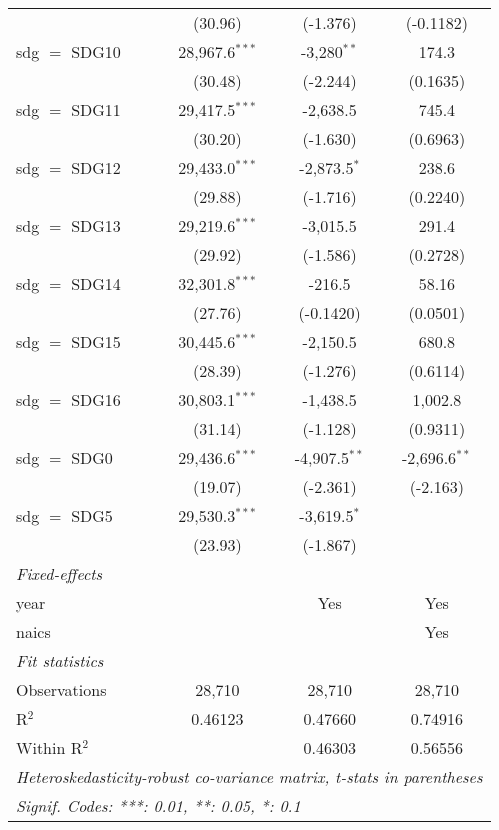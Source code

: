 \begin{tabular}{lccc}
                 & (30.96)          & (-1.376)        & (-0.1182)\\   
   sdg $=$ SDG10 & 28,967.6$^{***}$ & -3,280$^{**}$   & 174.3\\   
                 & (30.48)          & (-2.244)        & (0.1635)\\   
   sdg $=$ SDG11 & 29,417.5$^{***}$ & -2,638.5        & 745.4\\   
                 & (30.20)          & (-1.630)        & (0.6963)\\   
   sdg $=$ SDG12 & 29,433.0$^{***}$ & -2,873.5$^{*}$  & 238.6\\   
                 & (29.88)          & (-1.716)        & (0.2240)\\   
   sdg $=$ SDG13 & 29,219.6$^{***}$ & -3,015.5        & 291.4\\   
                 & (29.92)          & (-1.586)        & (0.2728)\\   
   sdg $=$ SDG14 & 32,301.8$^{***}$ & -216.5          & 58.16\\   
                 & (27.76)          & (-0.1420)       & (0.0501)\\   
   sdg $=$ SDG15 & 30,445.6$^{***}$ & -2,150.5        & 680.8\\   
                 & (28.39)          & (-1.276)        & (0.6114)\\   
   sdg $=$ SDG16 & 30,803.1$^{***}$ & -1,438.5        & 1,002.8\\   
                 & (31.14)          & (-1.128)        & (0.9311)\\   
   sdg $=$ SDG0  & 29,436.6$^{***}$ & -4,907.5$^{**}$ & -2,696.6$^{**}$\\   
                 & (19.07)          & (-2.361)        & (-2.163)\\   
   sdg $=$ SDG5  & 29,530.3$^{***}$ & -3,619.5$^{*}$  &   \\   
                 & (23.93)          & (-1.867)        &   \\   
   \midrule
   \emph{Fixed-effects}\\
   year          &                  & Yes             & Yes\\  
   naics         &                  &                 & Yes\\  
   \midrule
   \emph{Fit statistics}\\
   Observations  & 28,710           & 28,710          & 28,710\\  
   R$^2$         & 0.46123          & 0.47660         & 0.74916\\  
   Within R$^2$  &                  & 0.46303         & 0.56556\\  
   \midrule \midrule
   \multicolumn{4}{l}{\emph{Heteroskedasticity-robust co-variance matrix, t-stats in parentheses}}\\
   \multicolumn{4}{l}{\emph{Signif. Codes: ***: 0.01, **: 0.05, *: 0.1}}\\
\end{tabular}
\par\endgroup


